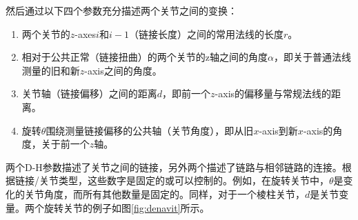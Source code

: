 然后通过以下四个参数充分描述两个关节之间的变换：
\begin{enumerate}
\item 两个关节的$z$-axes$i$和$i-1$（链接长度）之间的常用法线的长度$r$。
\item 相对于公共正常（链接扭曲）的两个关节的z轴之间的角度$\alpha$，即关于普通法线测量的旧和新$z$-axis之间的角度。
\item 关节轴（链接偏移）之间的距离$d$，即前一个$z$-axis的偏移量与常规法线的距离。
\item 旋转$\theta$围绕测量链接偏移的公共轴（关节角度），即从旧$x$-axis到新$x$-axis的角度，关于前一个$z$轴。
\end{enumerate}


两个D-H参数描述了关节之间的链接，另外两个描述了链路与相邻链路的连接。根据链接/关节类型，这些数字是固定的或可以控制的。例如，在旋转关节中，$\theta$是变化的关节角度，而所有其他数量是固定的。同样，对于一个棱柱关节，$d$是关节变量。两个旋转关节的例子如图\ref{fig:denavit}所示。

